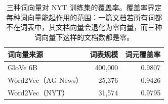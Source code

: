 \begin{table}[t]
\centering
\footnotesize
\caption{三种词向量对 NYT 训练集的覆盖率。覆盖率界定每种词向量能起作用的范围：一篇文档若所有词都不在词表中，其文档向量会退化为零向量，而三种词向量下这样的文档数都是零。}
\label{tab:coverage}
\begin{tabular}{lrr}
\toprule
词向量来源 & 词表规模 & 词元覆盖率 \\
\midrule
GloVe 6B & 400,000 & 0.9807 \\
Word2Vec（AG News） & 25,376 & 0.9426 \\
Word2Vec（NYT） & 31,574 & 0.9795 \\
\bottomrule
\end{tabular}
\end{table}
